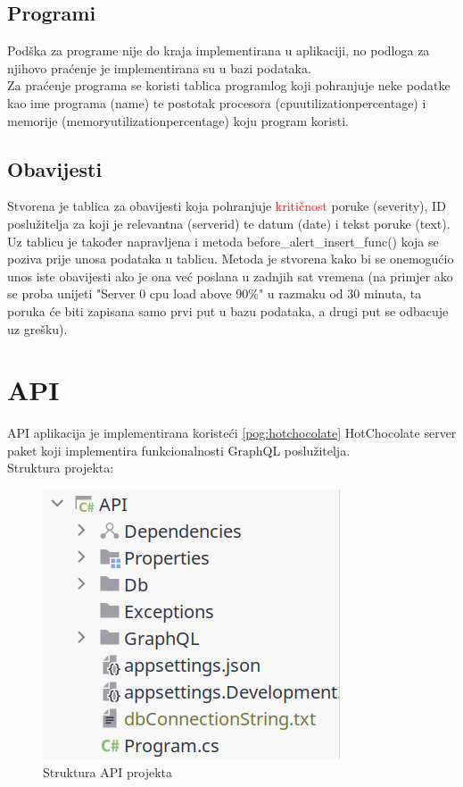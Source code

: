 \documentclass[zavrsnirad]{fer}
\begin{document}
\section{Programi}
Podška za programe nije do kraja implementirana u aplikaciji, no podloga za njihovo praćenje je implementirana su u bazi podataka.
\\Za praćenje programa se koristi tablica programlog koji pohranjuje  neke podatke kao ime programa (name) te postotak procesora (cpuutilizationpercentage) i memorije (memoryutilizationpercentage) koju program koristi.

\section{Obavijesti}
Stvorena je tablica za obavijesti koja pohranjuje \textcolor{red}{kritičnost} poruke (severity), ID poslužitelja za koji je relevantna (serverid) te datum (date) i tekst poruke (text).
\\Uz tablicu je također napravljena i metoda before\_alert\_insert\_func() koja se poziva prije unosa podataka u tablicu. Metoda je stvorena kako bi se onemogućio unos iste obavijesti ako je ona već poslana u zadnjih sat vremena (na primjer ako se proba unijeti "Server 0 cpu load above 90\%" u razmaku od 30 minuta, ta poruka će biti zapisana samo prvi put u bazu podataka, a drugi put se odbacuje uz grešku).


\chapter{API}
API aplikacija je implementirana koristeći \ref{pog:hotchocolate} HotChocolate server paket koji implementira funkcionalnosti GraphQL poslužitelja.
\\Struktura projekta:
\begin{figure}[htb]
	\centering
	\includegraphics[width=0.4\linewidth]{images/api_structure.png} 
	\caption{Struktura API projekta}
	\label{slk:api_structure}
\end{figure}
\end{document}
